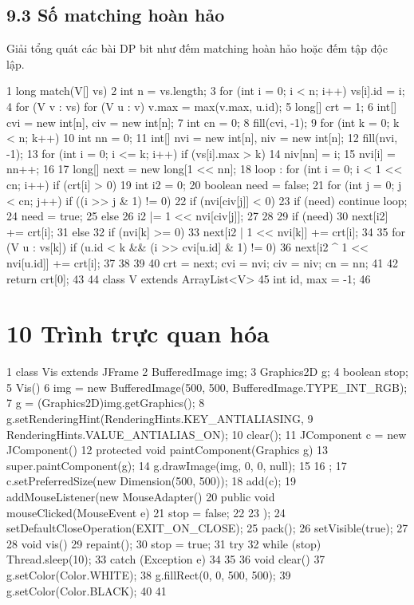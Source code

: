 \documentclass[11pt]{article}
\begin{document}
\subsection{9.3 Số matching hoàn hảo}
\begin{NoteBlock}
Giải tổng quát các bài DP bit như đếm matching hoàn hảo hoặc đếm tập độc lập.
\end{NoteBlock}
\begin{Code}
1 long match(V[] vs) {
2 int n = vs.length;
3 for (int i = 0; i < n; i++) vs[i].id = i;
4 for (V v : vs) for (V u : v) v.max = max(v.max, u.id);
5 long[] crt = {1};
6 int[] cvi = new int[n], civ = new int[n];
7 int cn = 0;
8 fill(cvi, -1);
9 for (int k = 0; k < n; k++) {
10 int nn = 0;
11 int[] nvi = new int[n], niv = new int[n];
12 fill(nvi, -1);
13 for (int i = 0; i <= k; i++) if (vs[i].max > k) {
14 niv[nn] = i;
15 nvi[i] = nn++;
16 }
17 long[] next = new long[1 << nn];
18 loop : for (int i = 0; i < 1 << cn; i++) if (crt[i] > 0) {
19 int i2 = 0;
20 boolean need = false;
21 for (int j = 0; j < cn; j++) if ((i >> j & 1) != 0) {
22 if (nvi[civ[j]] < 0) {
23 if (need) continue loop;
24 need = true;
25 } else {
26 i2 |= 1 << nvi[civ[j]];
27 }
28 }
29 if (need) {
30 next[i2] += crt[i];
31 } else {
32 if (nvi[k] >= 0) {
33 next[i2 | 1 << nvi[k]] += crt[i];
34 }
35 for (V u : vs[k]) if (u.id < k && (i >> cvi[u.id] & 1) != 0) {
36 next[i2 ^ 1 << nvi[u.id]] += crt[i];
37 }
38 }
39 }
40 crt = next; cvi = nvi; civ = niv; cn = nn;
41 }
42 return crt[0];
43 }
44 class V extends ArrayList<V> {
45 int id, max = -1;
46 }
\end{Code}
\section{10 Trình trực quan hóa}
\begin{Code}
1 class Vis extends JFrame {
2 BufferedImage img;
3 Graphics2D g;
4 boolean stop;
5 Vis() {
6 img = new BufferedImage(500, 500, BufferedImage.TYPE_INT_RGB);
7 g = (Graphics2D)img.getGraphics();
8 g.setRenderingHint(RenderingHints.KEY_ANTIALIASING,
9 RenderingHints.VALUE_ANTIALIAS_ON);
10 clear();
11 JComponent c = new JComponent() {
12 protected void paintComponent(Graphics g) {
13 super.paintComponent(g);
14 g.drawImage(img, 0, 0, null);
15 }
16 };
17 c.setPreferredSize(new Dimension(500, 500));
18 add(c);
19 addMouseListener(new MouseAdapter() {
20 public void mouseClicked(MouseEvent e) {
21 stop = false;
22 }
23 });
24 setDefaultCloseOperation(EXIT_ON_CLOSE);
25 pack();
26 setVisible(true);
27 }
28 void vis() {
29 repaint();
30 stop = true;
31 try {
32 while (stop) Thread.sleep(10);
33 } catch (Exception e) {
34 }
35 }
36 void clear() {
37 g.setColor(Color.WHITE);
38 g.fillRect(0, 0, 500, 500);
39 g.setColor(Color.BLACK);
40 }
41 }
\end{Code}
\end{document}
